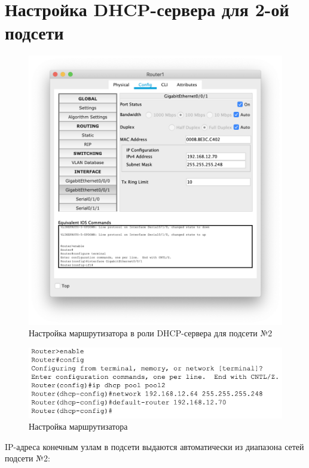 \section{Настройка DHCP-сервера для 2-ой подсети}%
\label{sec:2_net}
\begin{figure}[H]
    \centering
    \includegraphics[width=0.8\linewidth]{images/router_1.png}
    \caption{Настройка маршрутизатора в роли DHCP-сервера для подсети №2}%
\end{figure}

\begin{figure}[H]
    \centering
    \includegraphics[width=0.8\linewidth]{images/router_1_conf.png}
    \caption{Настройка маршрутизатора}%
\end{figure}

IP-адреса конечным узлам в подсети выдаются автоматически из диапазона сетей подсети №2:

